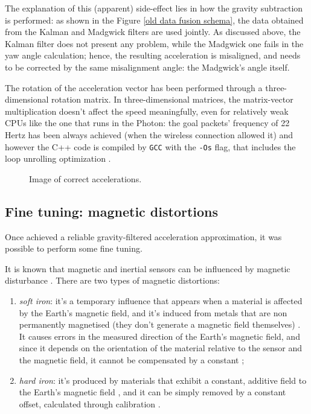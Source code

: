 The explanation of this (apparent) side-effect lies in how the gravity subtraction is performed: as shown in the Figure \ref{old data fusion schema}, the data obtained from the Kalman and Madgwick filters are used jointly. As discussed above, the Kalman filter does not present any problem, while the Madgwick one fails in the yaw angle calculation; hence, the resulting acceleration is misaligned, and needs to be corrected by the same misalignment angle: the Madgwick's angle itself.
\bigbreak

The rotation of the acceleration vector has been performed through a three-dimensional rotation matrix. In three-dimensional matrices, the matrix-vector multiplication doesn't affect the speed meaningfully, even for relatively weak CPUs like the one that runs in the Photon: the goal packets' frequency of 22 Hertz \cite{Pio19} has been always achieved (when the wireless connection allowed it) and however the C++ code is compiled by \texttt{GCC} with the \texttt{-Os} flag, that includes the loop unrolling optimization \cite{UsingGCC}.

\begin{center}
	\begin{figure}[ht]
		\caption{Image of correct accelerations.}
	\end{figure}
\end{center}

\subsection{Fine tuning: magnetic distortions}
Once achieved a reliable gravity-filtered acceleration approximation, it was possible to perform some fine tuning.
\bigbreak

It is known that magnetic and inertial sensors can be influenced by magnetic disturbance \cite{Fan17}.
There are two types of magnetic distortions:
\begin{enumerate}
	\item \textit{soft iron}: it's a temporary influence that appears when a material is affected by the Earth's magnetic field, and it's induced from metals that are non permanently magnetised (they don't generate a magnetic field themselves) \cite{Cro15}. It causes errors in the measured direction of the Earth's magnetic field, and since it depends on the orientation of the material relative to the sensor and the magnetic field, it cannot be compensated by a constant \cite{CompensatingIron};
	\item \textit{hard iron}: it's produced by materials that exhibit a constant, additive field to the Earth's magnetic field \cite{CompensatingIron}, and it can be simply removed by a constant offset, calculated through calibration \cite{CompensatingIron, Geb06, Kok12}.
\end{enumerate}


